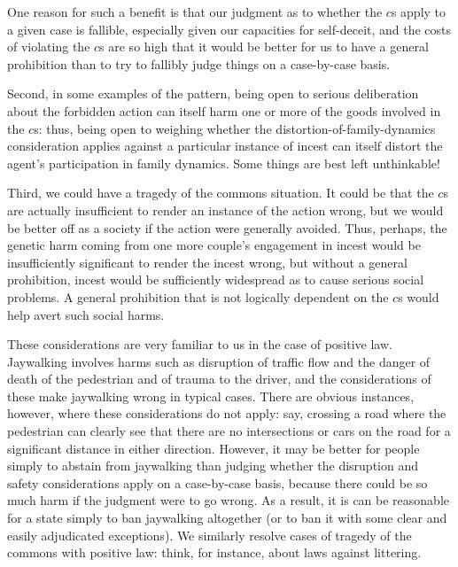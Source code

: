 One reason for such a benefit is that our judgment as to whether the $c$s apply to a given case is fallible, especially given our capacities
for self-deceit, and the costs of violating the $c$s are so high that it would be better for us to have a 
general prohibition than to try to fallibly judge things on a case-by-case basis. 

Second, in some examples of
the pattern, being open to serious deliberation about the forbidden action can itself harm one or more of the goods
involved in the $c$s: thus, being open to weighing whether the distortion-of-family-dynamics consideration
applies against a particular instance of incest can itself distort the agent's participation in family
dynamics. Some things are best left unthinkable!

Third, we could have a tragedy of the commons situation. It could be that the $c$s are actually insufficient
to render an instance of the action wrong, but we would be better off as a society if the action were generally
avoided. Thus, perhaps, the genetic harm coming from one more couple's engagement in incest
would be insufficiently significant to render the incest wrong, but without a general prohibition, incest
would be sufficiently widespread as to cause serious social problems. A general prohibition that is not
logically dependent on the $c$s would help avert such social harms.

These considerations are very familiar to us in the case of positive law. Jaywalking involves harms such as
disruption of traffic flow and the danger of death of the pedestrian and of trauma to the driver, and the
considerations of these make jaywalking wrong in typical cases. There are 
obvious instances, however, where these considerations do not apply: say, crossing a road where the pedestrian
can clearly see that there are no intersections or cars on the road for a significant distance in either 
direction. However, it may be better for people simply to abstain from jaywalking than judging whether the 
disruption and safety considerations apply on a case-by-case basis, because there could be so much harm if 
the judgment were to go wrong. As a result, it is can be reasonable for a state simply to ban jaywalking
altogether (or to ban it with some clear and easily adjudicated exceptions). We similarly resolve cases of
tragedy of the commons with positive law: think, for instance, about laws against littering.

